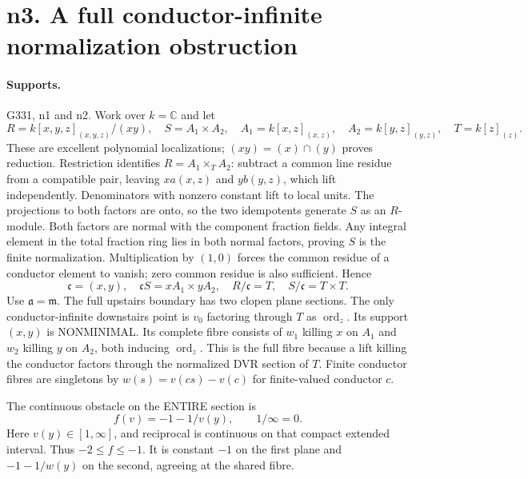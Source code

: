 \section{n3. A full conductor-infinite normalization obstruction}
\paragraph{Supports.} G331, n1 and n2.
Work over $k=\mathbb C$ and let
\[
 R=k[x,y,z]_{(x,y,z)}/(xy),\quad S=A_1\times A_2,
 \quad A_1=k[x,z]_{(x,z)},\quad A_2=k[y,z]_{(y,z)},\quad T=k[z]_{(z)}.
\]
These are excellent polynomial localizations; $(xy)=(x)\cap(y)$ proves reduction. Restriction identifies $R=A_1\times_T A_2$: subtract a common line residue from a compatible pair, leaving $xa(x,z)$ and $yb(y,z)$, which lift independently. Denominators with nonzero constant lift to local units. The projections to both factors are onto, so the two idempotents generate $S$ as an $R$-module. Both factors are normal with the component fraction fields. Any integral element in the total fraction ring lies in both normal factors, proving $S$ is the finite normalization. Multiplication by $(1,0)$ forces the common residue of a conductor element to vanish; zero common residue is also sufficient. Hence
\[
 \mathfrak c=(x,y),\quad \mathfrak cS=xA_1\times yA_2,
 \quad R/\mathfrak c=T,\quad S/\mathfrak c=T\times T.
\]
Use $\mathfrak a=\mathfrak m$. The full upstairs boundary has two clopen plane sections. The only conductor-infinite downstairs point is $v_0$ factoring through $T$ as $\operatorname{ord}_z$. Its support $(x,y)$ is NONMINIMAL. Its complete fibre consists of $w_1$ killing $x$ on $A_1$ and $w_2$ killing $y$ on $A_2$, both inducing $\operatorname{ord}_z$. This is the full fibre because a lift killing the conductor factors through the normalized DVR section of $T$. Finite conductor fibres are singletons by $w(s)=v(cs)-v(c)$ for finite-valued conductor $c$.

The continuous obstacle on the ENTIRE section is
\[
 f(v)=-1-1/v(y),\qquad 1/\infty=0.
\]
Here $v(y)\in[1,\infty]$, and reciprocal is continuous on that compact extended interval. Thus $-2\le f\le-1$. It is constant $-1$ on the first plane and $-1-1/w(y)$ on the second, agreeing at the shared fibre.

